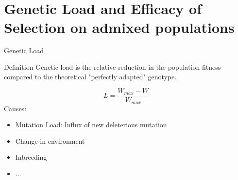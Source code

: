 \documentclass[10pt]{beamer}
\begin{document}
\section{Genetic Load and Efficacy of Selection on admixed populations}

\begin{frame}{Genetic Load}
  \begin{alertblock}{Definition}
    Genetic load is the relative reduction in the population fitness compared
    to the theoretical "perfectly adapted" genotype.
  \end{alertblock}
  \[
    L = \frac{W_{max} - W}{W_{max}}
  \]
  Causes:
  \begin{itemize}
    \item \underline{Mutation Load}: Influx of new deleterious mutation
    \item Change in environment
    \item Inbreeding 
    \item ...
  \end{itemize}
\end{frame}
\end{document}
